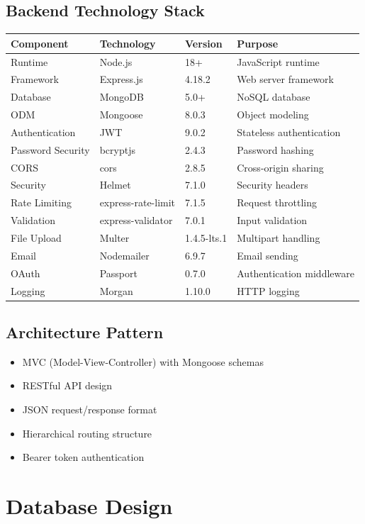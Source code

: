 \documentclass{article}
\begin{document}
\subsection{Backend Technology Stack}
\begin{longtable}{|l|l|l|l|}
\hline
\textbf{Component} & \textbf{Technology} & \textbf{Version} & \textbf{Purpose} \\
\hline
Runtime & Node.js & 18+ & JavaScript runtime \\
Framework & Express.js & 4.18.2 & Web server framework \\
Database & MongoDB & 5.0+ & NoSQL database \\
ODM & Mongoose & 8.0.3 & Object modeling \\
Authentication & JWT & 9.0.2 & Stateless authentication \\
Password Security & bcryptjs & 2.4.3 & Password hashing \\
CORS & cors & 2.8.5 & Cross-origin sharing \\
Security & Helmet & 7.1.0 & Security headers \\
Rate Limiting & express-rate-limit & 7.1.5 & Request throttling \\
Validation & express-validator & 7.0.1 & Input validation \\
File Upload & Multer & 1.4.5-lts.1 & Multipart handling \\
Email & Nodemailer & 6.9.7 & Email sending \\
OAuth & Passport & 0.7.0 & Authentication middleware \\
Logging & Morgan & 1.10.0 & HTTP logging \\
\hline
\end{longtable}

\subsection{Architecture Pattern}
\begin{itemize}
    \item MVC (Model-View-Controller) with Mongoose schemas
    \item RESTful API design
    \item JSON request/response format
    \item Hierarchical routing structure
    \item Bearer token authentication
\end{itemize}

\section{Database Design}
\end{document}
